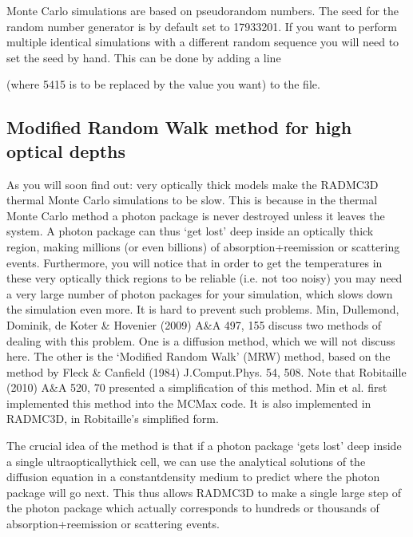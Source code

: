 \documentclass[letterpaper,10pt,english]{sphinxmanual}
\begin{document}
 Monte Carlo simulations are based on pseudo\sphinxhyphen{}random numbers.
The seed for the random number generator is by default set to \sphinxhyphen{}17933201.
If you want to perform multiple identical simulations with a different
random sequence you will need to set the seed by hand. This can be
done by adding a line

\begin{sphinxVerbatim}[commandchars=\\\{\}]
  
\end{sphinxVerbatim}

(where \sphinxhyphen{}5415 is to be replaced by the value you want) to the  file.


\subsection{Modified Random Walk method for high optical depths}
\label{\detokenize{dustradtrans:modified-random-walk-method-for-high-optical-depths}}\label{\detokenize{dustradtrans:sec-modrandwalk}}
As you will soon find out: very optically thick models make the RADMC\sphinxhyphen{}3D thermal
Monte Carlo simulations to be slow. This is because in the thermal Monte Carlo
method a photon package is never destroyed unless it leaves the system. A photon
package can thus ‘get lost’ deep inside an optically thick region, making
millions (or even billions) of absorption+reemission or scattering
events. Furthermore, you will notice that in order to get the temperatures in
these very optically thick regions to be reliable (i.e. not too noisy) you may
need a very large number of photon packages for your simulation, which slows
down the simulation even more. It is hard to prevent such problems. Min,
Dullemond, Dominik, de Koter \& Hovenier (2009) A\&A 497, 155 discuss two methods
of dealing with this problem. One is a diffusion method, which we will not
discuss here. The other is the ‘Modified Random Walk’ (MRW) method, based on the
method by Fleck \& Canfield (1984) J.Comput.Phys. 54, 508. Note that
Robitaille (2010) A\&A 520, 70 presented a simplification of this method. Min et
al. first implemented this method into the MCMax code. It is also implemented in
RADMC\sphinxhyphen{}3D, in Robitaille’s simplified form.

The crucial idea of the method is that if a photon package ‘gets lost’ deep
inside a single ultra\sphinxhyphen{}optically\sphinxhyphen{}thick cell, we can use the analytical solutions
of the diffusion equation in a constant\sphinxhyphen{}density medium to predict where the
photon package will go next. This thus allows RADMC\sphinxhyphen{}3D to make a single large
step of the photon package which actually corresponds to hundreds or thousands
of absorption+reemission or scattering events.
\end{document}
